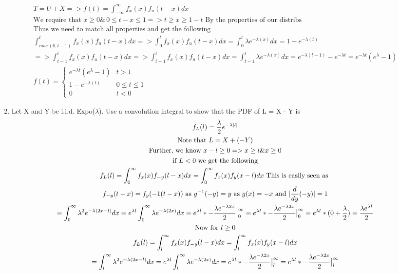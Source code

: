\documentclass[11pt]{article}
\begin{document}
\begin{enumerate}
\begin{gather}
	T=U+X=>f(t)=\int_{-\infty}^{\infty}f_x(x)f_u(t-x)dx \\
	\text{We require that } x\ge0 \& \, 0\le t-x\le 1 => t\ge x\ge 1-t \text{ By the properties of our distribs} \\
	\text{Thus we need to match all properties and get the following}\\
	\int_{max(0,t-1)}^{t}f_x(x)f_u(t-x)dx => \int_{0}^{t}f_x(x)f_u(t-x)dx = \int_{0}^{t} \lambda e^{-\lambda(x)} dx = 1- e^{-\lambda(t)}\\
	=>\int_{t-1}^{t}f_x(x)f_u(t-x)dx => \int_{t-1}^{t}f_x(x)f_u(t-x)dx = \int_{t-1}^{t} \lambda e^{-\lambda(x)} dx = e^{-\lambda(t-1)}- e^{-\lambda t} = e^{-\lambda t}(e^\lambda -1)\\
	f(t)=\begin{cases}
	e^{-\lambda t}(e^\lambda -1) & t > 1 \\
	1- e^{-\lambda(t)} & 0\le t \le 1 \\
	0 &t<0
	\end{cases}
\end{gather}
\item Let X and Y be i.i.d. Expo($\lambda$). Use a convolution integral to show that the PDF of L = X - Y is
\begin{gather}
	f_L(l) = \frac{\lambda}{2}e^{-\lambda|l|}\\
	\text{Note that } L = X + (-Y)\\
	\text{Further, we  know } x-l\ge0 => x\ge l \& x\ge0\\
	\text{ if } L<0 \text{ we get the following }\\
	f_L(l) = \int_{0}^{\infty}f_x(x)f_{-y}(l-x)dx =  \int_{0}^{\infty}f_x(x)f_{y}(x-l)dx \text{ This is easily seen as }\\
	f_{-y}(t-x) = f_{y}(-1(t-x)) \text{ as }g^{-1}(-y)=y \text{ as } g(x) = -x \text{ and } |\frac{d}{dy}(-y)| = 1\\
	=\int_{0}^{\infty}\lambda^2 e^{-\lambda(2x-l)}dx = e^{\lambda l}\int_{0}^{\infty}\lambda e^{-\lambda(2x)}dx = e^{\lambda l} * -\frac{\lambda e^{-\lambda 2x}}{2}\big{|}_0^\infty =  e^{\lambda l} * -\frac{\lambda e^{-\lambda 2x}}{2}\big{|}_0^\infty = e^{\lambda l} * (0+\frac{\lambda}{2}) = \frac{\lambda e^{\lambda l}}{2}\\
	\text{Now for } l\ge 0\\
	f_L(l) = \int_{l}^{\infty}f_x(x)f_{-y}(l-x)dx =  \int_{l}^{\infty}f_x(x)f_{y}(x-l)dx \\
	=\int_{l}^{\infty}\lambda^2 e^{-\lambda(2x-l)}dx = e^{\lambda l}\int_{l}^{\infty}\lambda e^{-\lambda(2x)}dx = e^{\lambda l} * -\frac{\lambda e^{-\lambda 2x}}{2}\big{|}_l^\infty =  e^{\lambda l} * -\frac{\lambda e^{-\lambda 2x}}{2}\big{|}_l^\infty \\

\end{gather}
\end{enumerate}
\end{document}
